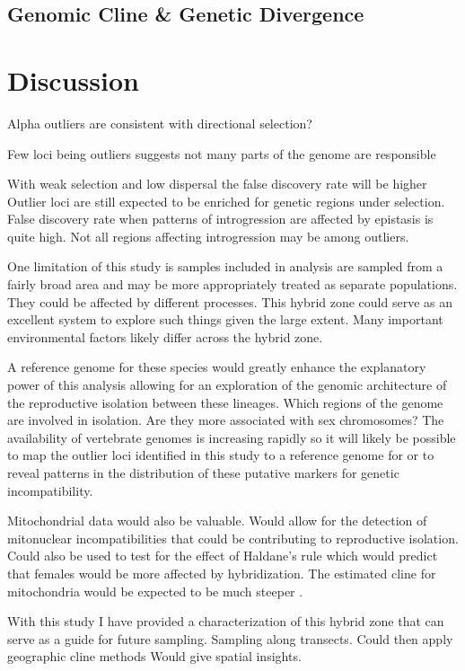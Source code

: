 \subsection{Genomic Cline \& Genetic Divergence}





\section{Discussion}

Alpha outliers are consistent with directional selection?

Few loci being outliers suggests not many parts of the genome are responsible 




With weak selection and low dispersal the false discovery rate will be higher \parencite{gompert2011}
Outlier loci are still expected to be enriched for genetic regions under selection.
False discovery rate when patterns of introgression are affected by epistasis
is quite high. Not all regions affecting introgression may be among outliers.  


One limitation of this study is samples included in analysis are sampled from 
a fairly broad area and may be more appropriately treated as separate populations.
They could be affected by different processes. %
This hybrid zone could serve as an excellent system to explore such things
given the large extent. Many important environmental factors likely differ 
across the hybrid zone.


A reference genome for these species would greatly enhance the explanatory power of
this analysis allowing for an exploration of the genomic architecture of the   
reproductive isolation between these lineages. Which regions of the genome are 
involved in isolation. Are they more associated with sex chromosomes?
The availability of vertebrate genomes is increasing rapidly so it will likely 
be possible to map the outlier loci identified in this study to a reference genome
for \amer or \terr to reveal patterns in the distribution of these putative 
markers for genetic incompatibility. 


Mitochondrial data would also be valuable. Would allow for the detection of 
mitonuclear incompatibilities that could be contributing to reproductive isolation.
Could also be used to test for the effect of Haldane's rule which would predict  
that females would be more affected by hybridization. The estimated cline
for mitochondria would be expected to be much steeper \parencite{carling2008}.

With this study I have provided a characterization of this hybrid zone that can
serve as a guide for future sampling. 
Sampling along transects.
Could then apply geographic cline methods
Would give spatial insights.



